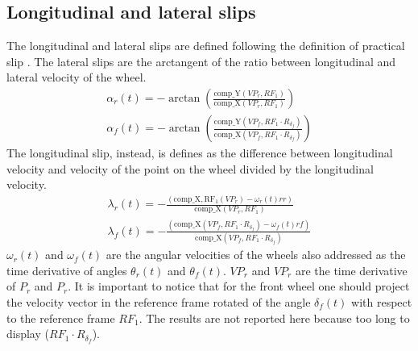 \subsection{Longitudinal and lateral slips}
%
The longitudinal and lateral slips are defined following the definition of practical slip \cite{lot2004motorcycle,pacejka2006tyre}.
The lateral slips are the arctangent of the ratio between longitudinal and lateral velocity of the wheel. 
%
\begin{equation}
    \begin{array}{l}
        \displaystyle \alpha_r(t) = -\arctan( \frac{ \mathrm{comp\_Y}(VP_r,RF_1) }{\mathrm{comp\_X}(VP_r,RF_1)} )\\
        \displaystyle \alpha_f(t) = -\arctan( \frac{\mathrm{comp\_Y}(VP_f,RF_1\cdot R_{\delta_f})}{\mathrm{comp\_X}(VP_f,RF_1\cdot R_{\delta_f})} )
    \end{array}
\end{equation}
%
The longitudinal slip, instead, is defines as the difference between longitudinal velocity and velocity of the point on the wheel divided by the longitudinal velocity.
%
\begin{equation}
    \begin{array}{l}
        \displaystyle \lambda_r(t) = - \frac{( \mathrm{comp\_X,RF_1}(VP_r)  - \omega_r(t) rr )}{\mathrm{comp\_X}(VP_r,RF_1)}\\  
        \displaystyle \lambda_f(t) = - \frac{( \mathrm{comp\_X}(VP_f,RF_1\cdot R_{\delta_f})  - \omega_f(t) rf )}{\mathrm{comp\_X}(VP_f,RF_1\cdot R_{\delta_f})}
    \end{array}
\end{equation}
%
$\omega_r(t)$ and $\omega_f(t)$ are the angular velocities of the wheels also addressed as the time derivative of angles $\theta_r(t)$ and $\theta_f(t)$. $VP_r$ and $VP_r$ are the time derivative of $P_r$ and $P_r$. 
It is important to notice that for the front wheel one should project the velocity vector in the reference frame rotated of the angle $\delta_f(t)$ with respect to the reference frame $RF_1$. 
The results are not reported here because too long to display ($RF_1\cdot R_{\delta_f}$). 
%